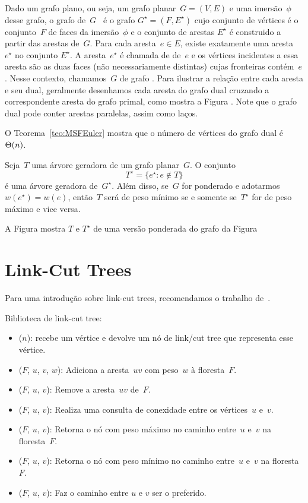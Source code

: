 Dado um grafo plano, ou seja, um grafo planar~$G=(V,E)$ e uma imersão~$\phi$ desse grafo, o grafo  de~$G$~\cite{planarTheoryAlgorith} é o grafo $G^\star = (F,E^\star)$ cujo conjunto de vértices é o conjunto~$F$ de faces da imersão~$\phi$ e o conjunto de arestas $E^\star$ é construido a partir das arestas de~$G$.
Para cada aresta~$e\in E$, existe exatamente uma aresta~$e^\star$ no conjunto $E^\star$.
A aresta~$e^\star$ é chamada de  de~$e$ e os vértices incidentes a essa aresta são as duas faces (não necessariamente distintas) cujas fronteiras contém~$e$.
Nesse contexto, chamamos~$G$ de grafo .
Para ilustrar a relação entre cada aresta e seu dual, geralmente desenhamos cada aresta do grafo dual cruzando a correspondente aresta do grafo primal, como mostra a Figura .
Note que o grafo dual pode conter arestas paralelas, assim como laços.



O Teorema~\ref{teo:MSFEuler} mostra que o número de vértices do grafo dual é $\Theta(n)$.

\begin{theorem}
\label{teo:MSFdual}
Seja~$T$ uma árvore geradora de um grafo planar~$G$. O conjunto
$$
T^\star = \{e^\star:e\notin T\}
$$
é uma árvore geradora de~$G^\star$.
Além disso, se~$G$ for ponderado e adotarmos $w(e^\star) = w(e)$, então~$T$ será de peso mínimo se e somente se~$T^\star$ for de peso máximo e vice versa.
\end{theorem}

A Figura  mostra $T$ e $T^\star$ de uma versão ponderada do grafo da Figura 



\section{Link-Cut Trees}
\label{sec:linkcuttree}

Para uma introdução sobre link-cut trees, recomendamos o trabalho de~\cite{linkcuttree}.

Biblioteca de link-cut tree:
\begin{itemize}
\item \linkcutCreate($n$): recebe um vértice e devolve um nó de link/cut tree que representa esse vértice.
\item \linkcutAddEdge($F$, $u$, $v$, $w$): Adiciona a aresta~$uv$ com peso~$w$ à floresta~$F$.
\item \linkcutDelEdge($F$, $u$, $v$): Remove a aresta~$uv$ de~$F$.
\item \linkcutQuery($F$, $u$, $v$): Realiza uma consulta de conexidade entre os vértices~$u$ e~$v$.
\item \linkcutMax($F$, $u$, $v$): Retorna o nó com peso máximo no caminho entre~$u$ e~$v$ na floresta~$F$.
\item \linkcutMin($F$, $u$, $v$): Retorna o nó com peso mínimo no caminho entre~$u$ e~$v$ na floresta~$F$.
\item \linkcutPath($F$, $u$, $v$): Faz o caminho entre $u$ e $v$ ser o preferido.
\end{itemize}


